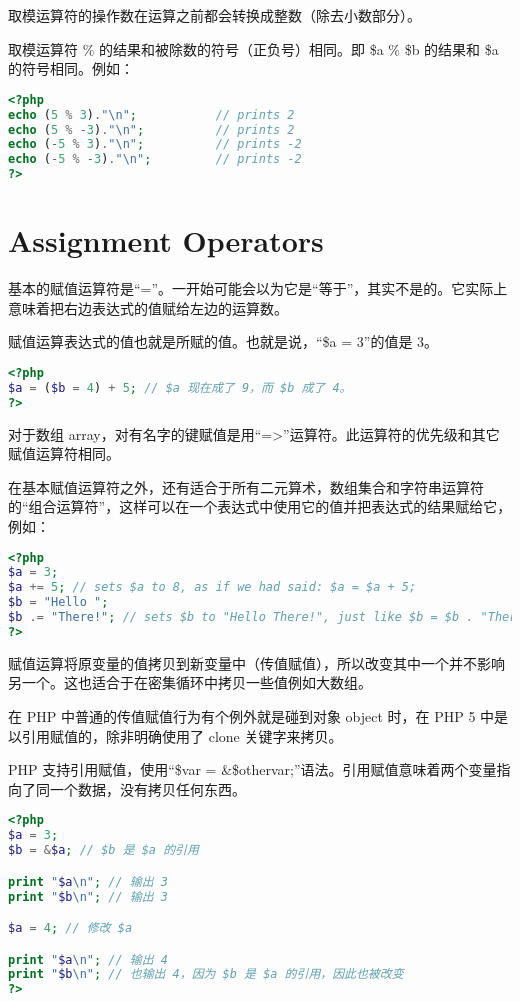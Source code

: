 取模运算符的操作数在运算之前都会转换成整数（除去小数部分）。

取模运算符 \% 的结果和被除数的符号（正负号）相同。即 \$a \% \$b 的结果和 \$a 的符号相同。例如：

\begin{lstlisting}[language=PHP]
<?php
echo (5 % 3)."\n";           // prints 2
echo (5 % -3)."\n";          // prints 2
echo (-5 % 3)."\n";          // prints -2
echo (-5 % -3)."\n";         // prints -2
?>
\end{lstlisting}



\section{Assignment Operators}

基本的赋值运算符是“=”。一开始可能会以为它是“等于”，其实不是的。它实际上意味着把右边表达式的值赋给左边的运算数。

赋值运算表达式的值也就是所赋的值。也就是说，“\$a = 3”的值是 3。



\begin{lstlisting}[language=PHP]
<?php
$a = ($b = 4) + 5; // $a 现在成了 9，而 $b 成了 4。
?>
\end{lstlisting}

对于数组 array，对有名字的键赋值是用“=>”运算符。此运算符的优先级和其它赋值运算符相同。

在基本赋值运算符之外，还有适合于所有二元算术，数组集合和字符串运算符的“组合运算符”，这样可以在一个表达式中使用它的值并把表达式的结果赋给它，例如：

\begin{lstlisting}[language=PHP]
<?php
$a = 3;
$a += 5; // sets $a to 8, as if we had said: $a = $a + 5;
$b = "Hello ";
$b .= "There!"; // sets $b to "Hello There!", just like $b = $b . "There!";
?>
\end{lstlisting}

赋值运算将原变量的值拷贝到新变量中（传值赋值），所以改变其中一个并不影响另一个。这也适合于在密集循环中拷贝一些值例如大数组。

在 PHP 中普通的传值赋值行为有个例外就是碰到对象 object 时，在 PHP 5 中是以引用赋值的，除非明确使用了 clone 关键字来拷贝。

PHP 支持引用赋值，使用“\$var = \&\$othervar;”语法。引用赋值意味着两个变量指向了同一个数据，没有拷贝任何东西。

\begin{lstlisting}[language=PHP]
<?php
$a = 3;
$b = &$a; // $b 是 $a 的引用

print "$a\n"; // 输出 3
print "$b\n"; // 输出 3

$a = 4; // 修改 $a

print "$a\n"; // 输出 4
print "$b\n"; // 也输出 4，因为 $b 是 $a 的引用，因此也被改变
?>
\end{lstlisting}

